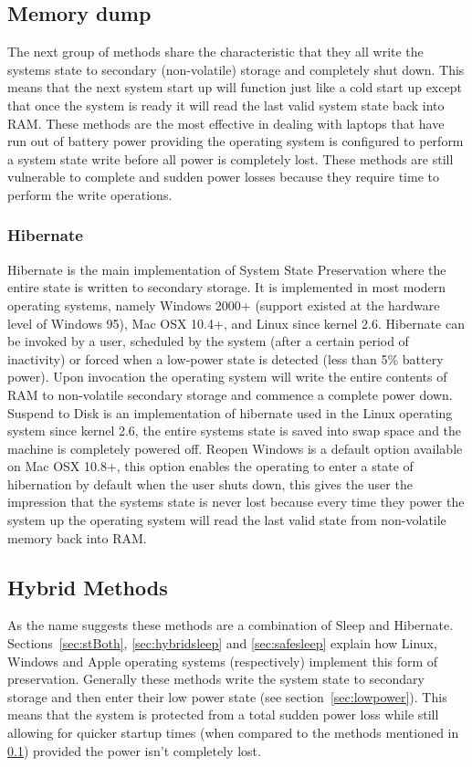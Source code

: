 \documentclass[a4paper,12pt]{article}
\begin{document}
\subsection{Memory dump}\label{sec:memorydump}
The next group of methods share the characteristic that they all write the systems state to secondary (non-volatile) storage and completely shut down. This means that the next system start up will function just like a cold start up except that once the system is ready it will read the last valid system state back into RAM.
These methods are the most effective in dealing with laptops that have run out of battery power providing the operating system is configured to perform a system state write before all power is completely lost. These methods are still vulnerable to complete and sudden power losses because they require time to perform the write operations.

\subsubsection{Hibernate}\label{sec:hibernate}
Hibernate is the main implementation of System State Preservation where the entire state is written to secondary storage. It is implemented in most modern operating systems, namely Windows 2000+ (support existed at the hardware level of Windows 95), Mac OSX 10.4+, and Linux since kernel 2.6.
Hibernate can be invoked by a user, scheduled by the system (after a certain period of inactivity) or forced when a low-power state is detected (less than 5\% battery power). Upon invocation the operating system will write the entire contents of RAM to non-volatile secondary storage and commence a complete power down.
Suspend to Disk\label{sec:stDisk} is an implementation of hibernate used in the Linux operating system since kernel 2.6, the entire systems state is saved into swap space and the machine is completely powered off\citep{Wiki}.
Reopen Windows\label{sec:reopen}
is a default option available on Mac OSX 10.8+, this option enables the operating to enter a state of hibernation by default when the user shuts down, this gives the user the impression that the systems state is never lost because every time they power the system up the operating system will read the last valid state from non-volatile memory back into RAM.

\subsection{Hybrid Methods}
As the name suggests these methods are a combination of Sleep and Hibernate. Sections~\ref{sec:stBoth}, \ref{sec:hybridsleep} and \ref{sec:safesleep} explain how Linux, Windows and Apple operating systems (respectively) implement this form of preservation.
Generally these methods write the system state to secondary storage and then enter their low power state (see section~\ref{sec:lowpower}). This means that the system is protected from a total sudden power loss while still allowing for quicker startup times (when compared to the methods mentioned in \ref{sec:memorydump}) provided the power isn't completely lost. 
\end{document}
